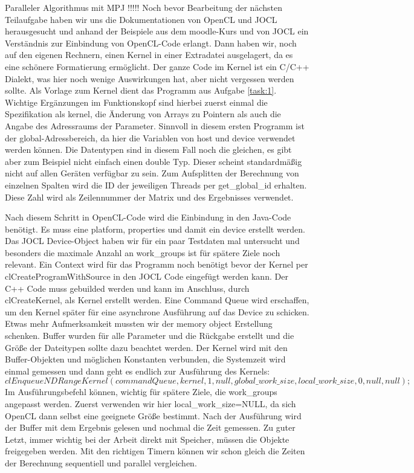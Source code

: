 \documentclass[
ngerman,
subtask=ruled %
]{tudaexercise}
\begin{document}
	
	\begin{task}{Paralleler Algorithmus mit MPJ}
		!!!!!
		Noch bevor Bearbeitung der nächsten Teilaufgabe haben wir uns die Dokumentationen von OpenCL und JOCL herausgesucht und anhand der Beispiele aus dem moodle-Kurs und von JOCL ein Verständnis zur Einbindung von OpenCL-Code erlangt.
		Dann haben wir, noch auf den eigenen Rechnern, einen Kernel in einer Extradatei ausgelagert, da es eine schönere Formatierung ermöglicht.
		Der ganze Code im Kernel ist ein C/C++ Dialekt, was hier noch wenige Auswirkungen hat, aber nicht vergessen werden sollte.
		Als Vorlage zum Kernel dient das Programm aus Aufgabe \ref{task:1}. Wichtige Ergänzungen im Funktionskopf sind hierbei zuerst einmal die Spezifikation als kernel, die Änderung von Arrays zu Pointern als auch die Angabe des Adressraums der Parameter.
		Sinnvoll in diesem ersten Programm ist der global-Adressbereich, da hier die Variablen von host und device verwendet werden können.
		Die Datentypen sind in diesem Fall noch die gleichen, es gibt aber zum Beispiel nicht einfach einen double Typ. Dieser scheint standardmäßig nicht auf allen Geräten verfügbar zu sein.
		Zum Aufsplitten der Berechnung von einzelnen Spalten wird die ID der jeweiligen Threads per get\_global\_id erhalten.
		Diese Zahl wird als Zeilennummer der Matrix und des Ergebnisses verwendet.
		
		Nach diesem Schritt in OpenCL-Code wird die Einbindung in den Java-Code benötigt.
		Es muss eine platform, properties und damit ein device erstellt werden. Das JOCL Device-Object haben wir für ein paar Testdaten mal untersucht und besonders die maximale Anzahl an work\_groups ist für spätere Ziele noch relevant.
		Ein Context wird für das Programm noch benötigt bevor der Kernel per clCreateProgramWithSource in den JOCL Code eingefügt werden kann.
		Der C++ Code muss gebuilded werden und kann im Anschluss, durch clCreateKernel, als Kernel erstellt werden.
		Eine Command Queue wird erschaffen, um den Kernel später für eine asynchrone Ausführung auf das Device zu schicken.
		Etwas mehr Aufmerksamkeit mussten wir der memory object Erstellung schenken. Buffer wurden für alle Parameter und die Rückgabe erstellt und die Größe der Dateitypen sollte dazu beachtet werden.
		Der Kernel wird mit den Buffer-Objekten und möglichen Konstanten verbunden, die Systemzeit wird einmal gemessen und dann geht es endlich zur Ausführung des Kernels:
		$clEnqueueNDRangeKernel(commandQueue, kernel, 1, null,
		global\_work\_size, local\_work\_size,
		0, null, null);$
		Im Ausführungsbefehl können, wichtig für spätere Ziele, die work\_groups angepasst werden. Zuerst verwenden wir hier local\_work\_size=NULL, da sich OpenCL dann selbst eine geeignete Größe bestimmt.
		Nach der Ausführung wird der Buffer mit dem Ergebnis gelesen und nochmal die Zeit gemessen.
		Zu guter Letzt, immer wichtig bei der Arbeit direkt mit Speicher, müssen die Objekte freigegeben werden.
		Mit den richtigen Timern können wir schon gleich die Zeiten der Berechnung sequentiell und parallel vergleichen.
		

\end{task}
\end{document}
